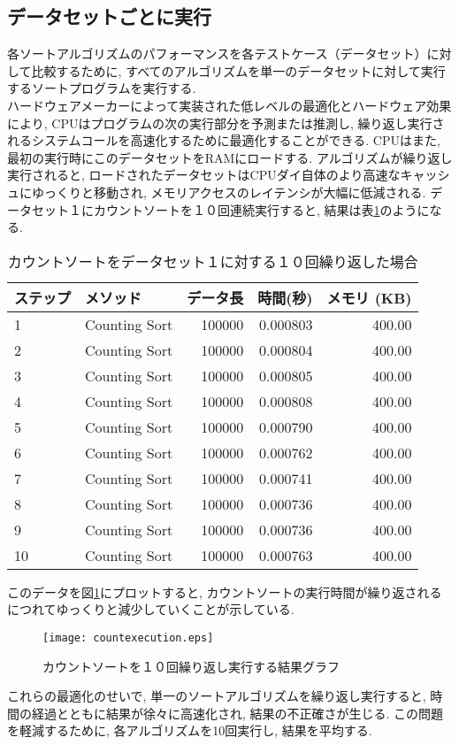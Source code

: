 \documentclass[a4j, 12pt]{jarticle}
\begin{document}
\subsection{データセットごとに実行}
各ソートアルゴリズムのパフォーマンスを各テストケース（データセット）に対して比較するために, すべてのアルゴリズムを単一のデータセットに対して実行するソートプログラムを実行する. \\
ハードウェアメーカーによって実装された低レベルの最適化とハードウェア効果により, CPUはプログラムの次の実行部分を予測または推測し, 繰り返し実行されるシステムコールを高速化するために最適化することができる\cite{mittal2018branch}. CPUはまた, 最初の実行時にこのデータセットをRAMにロードする. アルゴリズムが繰り返し実行されると, ロードされたデータセットはCPUダイ自体のより高速なキャッシュにゆっくりと移動され, メモリアクセスのレイテンシが大幅に低減される\cite{apple2023siliconcpuopt}. データセット１にカウントソートを１０回連続実行すると, 結果は表\ref{repeatedsortresult}のようになる. 
\begin{table}[H]
  \centering
  \caption{カウントソートをデータセット１に対する１０回繰り返した場合}\label{repeatedsortresult}
  \begin{tabular}{|l|l|r|r|r|}
    \hline
    \textbf{ステップ} & \textbf{メソッド} & \textbf{データ長} & \textbf{時間(秒)} & \textbf{メモリ (KB)} \\
    \hline
    1 & Counting Sort & 100000 & 0.000803 & 400.00 \\
    2 & Counting Sort & 100000 & 0.000804 & 400.00 \\
    3 & Counting Sort & 100000 & 0.000805 & 400.00 \\
    4 & Counting Sort & 100000 & 0.000808 & 400.00 \\
    5 & Counting Sort & 100000 & 0.000790 & 400.00 \\
    6 & Counting Sort & 100000 & 0.000762 & 400.00 \\
    7 & Counting Sort & 100000 & 0.000741 & 400.00 \\
    8 & Counting Sort & 100000 & 0.000736 & 400.00 \\
    9 & Counting Sort & 100000 & 0.000736 & 400.00 \\
    10 & Counting Sort & 100000 & 0.000763 & 400.00 \\
    \hline
  \end{tabular}
\end{table}
このデータを図\ref{repeatedsortgraph}にプロットすると, カウントソートの実行時間が繰り返されるにつれてゆっくりと減少していくことが示している. \\
\begin{figure}[H]
  \centering
  \texttt{[image: countexecution.eps]}
  \caption{カウントソートを１０回繰り返し実行する結果グラフ}\label{repeatedsortgraph}
\end{figure}
これらの最適化のせいで, 単一のソートアルゴリズムを繰り返し実行すると, 時間の経過とともに結果が徐々に高速化され, 結果の不正確さが生じる. この問題を軽減するために, 各アルゴリズムを10回実行し, 結果を平均する. \
\newpage
\end{document}
